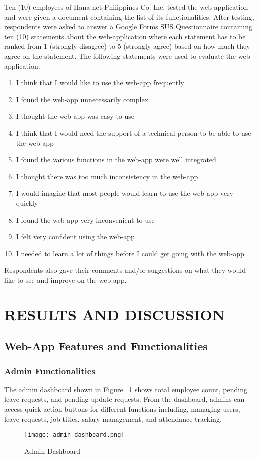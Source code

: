 \documentclass[journal]{./IEEE/IEEEtran}
\begin{document}
Ten (10) employees of Hana-net Philippines Co. Inc. tested the web-application and were given a document containing the list of its functionalities. After testing, respondents were asked to answer a Google Forms SUS Questionnaire containing ten (10) statements about the web-application where each statement has to be ranked from 1 (strongly disagree) to 5 (strongly agree) based on how much they agree on the statement. The following statements were used to evaluate the web-application:
    \begin{enumerate}
        \item I think that I would like to use the web-app frequently
        \item I found the web-app unnecessarily complex
        \item I thought the web-app was easy to use
        \item I think that I would need the support of a technical person to be able to use the web-app
        \item I found the various functions in the web-app were well integrated
        \item I thought there was too much inconsistency in the web-app
        \item I would imagine that most people would learn to use the web-app very quickly
        \item I found the web-app very inconvenient to use
        \item I felt very confident using the web-app
        \item I needed to learn a lot of things before I could get going with the web-app
    \end{enumerate}
Respondents also gave their comments and/or suggestions on what they would like to see and improve on the web-app.


\section{\textbf{RESULTS AND DISCUSSION}}
\subsection{\textbf{Web-App Features and Functionalities}}
\subsubsection{Admin Functionalities}
The admin dashboard shown in Figure ~\ref{fig:ad-dash} shows total employee count, pending leave requests, and pending update requests. From the dashboard, admins can access quick action buttons for different functions including, managing users, leave requests, job titles, salary management, and attendance tracking.
\begin{figure}[H]
    \centering
    \texttt{[image: admin-dashboard.png]}
    \caption{Admin Dashboard}
    \label{fig:ad-dash}
\end{figure}
\end{document}
